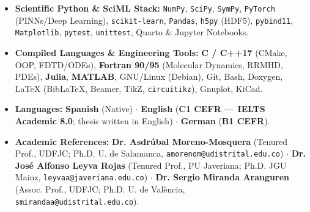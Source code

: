 \documentclass[10pt,a4paper]{article}
\begin{document}
\begin{itemize}
  \item \textbf{Scientific Python \& SciML Stack:} \texttt{NumPy}, \texttt{SciPy}, \texttt{SymPy}, \texttt{PyTorch} (PINNs/Deep Learning), \texttt{scikit-learn}, \texttt{Pandas}, \texttt{h5py} (HDF5), \texttt{pybind11}, \texttt{Matplotlib}, \texttt{pytest}, \texttt{unittest}, Quarto \& Jupyter Notebooks.
  \item \textbf{Compiled Languages \& Engineering Tools:} \textbf{C / C++17} (CMake, OOP, FDTD/ODEs), \textbf{Fortran 90/95} (Molecular Dynamics, RRMHD, PDEs), \textbf{Julia}, \textbf{MATLAB}, GNU/Linux (Debian), Git, Bash, Doxygen, \LaTeX{} (Bib\LaTeX, Beamer, TikZ, \texttt{circuitikz}), Gnuplot, KiCad.
  \item \textbf{Languages:} \textbf{Spanish} (Native) $\cdot$ \textbf{English} (\textbf{C1 CEFR --- IELTS Academic 8.0}; thesis written in English) $\cdot$ \textbf{German} (\textbf{B1 CEFR}).
  \item \textbf{Academic References:}
    \textbf{Dr. Asdr\'ubal Moreno-Mosquera} (Tenured Prof., UDFJC; Ph.D. U. de Salamanca, \texttt{amorenom@udistrital.edu.co}) $\cdot$
    \textbf{Dr. Jos\'e Alfonso Leyva Rojas} (Tenured Prof., PU Javeriana; Ph.D. JGU Mainz, \texttt{leyvaa@javeriana.edu.co}) $\cdot$
    \textbf{Dr. Sergio Miranda Aranguren} (Assoc. Prof., UDFJC; Ph.D. U. de Val\`encia, \texttt{smirandaa@udistrital.edu.co}).
\end{itemize}
\end{document}
